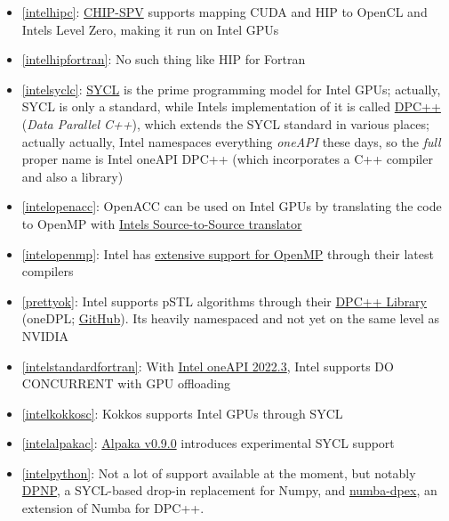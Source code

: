 \begin{frame}[allowframebreaks]
\begin{itemize}
        \item \ref{intelhipc}: \href{https://github.com/CHIP-SPV/chip-spv}{CHIP-SPV} supports mapping CUDA and HIP to OpenCL and Intel\textquotesingle s Level Zero, making it run on Intel GPUs
        \item \ref{intelhipfortran}: No such thing like HIP for Fortran
        \item \ref{intelsyclc}: \href{https://www.khronos.org/sycl/}{SYCL} is the prime programming model for Intel GPUs; actually, SYCL is only a standard, while Intel\textquotesingle s implementation of it is called \href{https://www.intel.com/content/www/us/en/developer/tools/oneapi/data-parallel-c-plus-plus.html}{DPC++} (\emph{Data Parallel C++}), which extends the SYCL standard in various places; actually actually, Intel namespaces everything \emph{oneAPI} these days, so the \emph{full} proper name is Intel oneAPI DPC++ (which incorporates a C++ compiler and also a library)
        \item \ref{intelopenacc}: OpenACC can be used on Intel GPUs by translating the code to OpenMP with \href{https://github.com/intel/intel-application-migration-tool-for-openacc-to-openmp}{Intel\textquotesingle s Source-to-Source translator}
        \item \ref{intelopenmp}: Intel has \href{https://www.intel.com/content/www/us/en/develop/documentation/get-started-with-cpp-fortran-compiler-openmp/top.html}{extensive support for OpenMP} through their latest compilers
        \item \ref{prettyok}: Intel supports pSTL algorithms through their \href{https://www.intel.com/content/www/us/en/developer/tools/oneapi/dpc-library.html\#gs.fifrh5}{DPC++ Library} (oneDPL; \href{https://github.com/oneapi-src/oneDPL}{GitHub}). It\textquotesingle s heavily namespaced and not yet on the same level as NVIDIA
        \item \ref{intelstandardfortran}: With \href{https://www.intel.com/content/www/us/en/developer/articles/release-notes/fortran-compiler-release-notes.html}{Intel oneAPI 2022.3}, Intel supports DO CONCURRENT with GPU offloading
        \item \ref{intelkokkosc}: Kokkos supports Intel GPUs through SYCL
        \item \ref{intelalpakac}: \href{https://github.com/alpaka-group/alpaka/releases/tag/0.9.0}{Alpaka v0.9.0} introduces experimental SYCL support
        \item \ref{intelpython}: Not a lot of support available at the moment, but notably \href{https://intelpython.github.io/dpnp/}{DPNP}, a SYCL-based drop-in replacement for Numpy, and \href{https://github.com/IntelPython/numba-dpex}{numba-dpex}, an extension of Numba for DPC++.
    \end{itemize}
\end{frame}